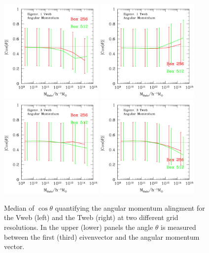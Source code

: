 \documentclass[usenatbib]{mn2e}
\begin{document}
\begin{figure}
\includegraphics[width=0.45\textwidth]{../plot2/Mass/jVWeb.pdf}
\includegraphics[width=0.45\textwidth]{../plot2/Mass/jTWeb.pdf}
\includegraphics[width=0.45\textwidth]{../plot2/Mass/jVWebV2.pdf}
\includegraphics[width=0.45\textwidth]{../plot2/Mass/jTWebV2.pdf}
\caption{Median of $\cos\theta$ quantifying the angular momentum
  alingment for the Vweb (left) and the Tweb (right) at two different
  grid resolutions. In the upper (lower)  panels the angle $\theta$ is
  measured between the first (third) eivenvector and the angular
  momentum vector.} 
\end{figure}
\end{document}
